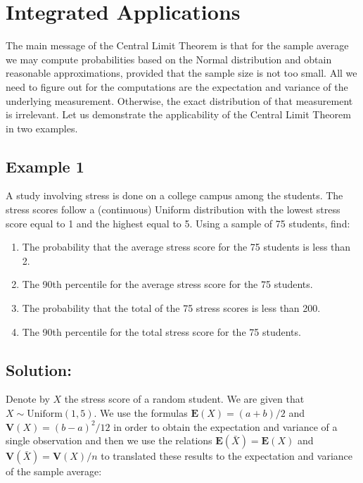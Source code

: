 \documentclass[]{krantz}
\newcommand{\Expec}{\mathbf{E}}
\newcommand{\Var}{\mathbf{V}}
\theoremstyle{definition}
\theoremstyle{definition}
\theoremstyle{definition}
\theoremstyle{remark}
\begin{document}
\hypertarget{integrated-applications}{%
\section{Integrated Applications}\label{integrated-applications}}

The main message of the Central Limit Theorem is that for the sample
average we may compute probabilities based on the Normal distribution
and obtain reasonable approximations, provided that the sample size is
not too small. All we need to figure out for the computations are the
expectation and variance of the underlying measurement. Otherwise, the
exact distribution of that measurement is irrelevant. Let us demonstrate
the applicability of the Central Limit Theorem in two examples.

\hypertarget{example-1}{%
\subsection{Example 1}\label{example-1}}

A study involving stress is done on a college campus among the students.
The stress scores follow a (continuous) Uniform distribution with the
lowest stress score equal to 1 and the highest equal to 5. Using a
sample of 75 students, find:

\begin{enumerate}
\def\labelenumi{\arabic{enumi}.}
\item
  The probability that the average stress score for the 75 students is
  less than 2.
\item
  The 90th percentile for the average stress score for the 75
  students.
\item
  The probability that the total of the 75 stress scores is less
  than 200.
\item
  The 90th percentile for the total stress score for the 75 students.
\end{enumerate}

\hypertarget{solution}{%
\subsection*{Solution:}\label{solution}}


Denote by \(X\) the stress score of a random student. We are given that
\(X \sim \mathrm{Uniform}(1,5)\). We use the formulas
\(\Expec(X) = (a+b)/2\) and \(\Var(X) = (b-a)^2/12\) in order to obtain the
expectation and variance of a single observation and then we use the
relations \(\Expec(\bar X) = \Expec(X)\) and \(\Var(\bar X) = \Var(X)/n\) to
translated these results to the expectation and variance of the sample
average:
\end{document}
